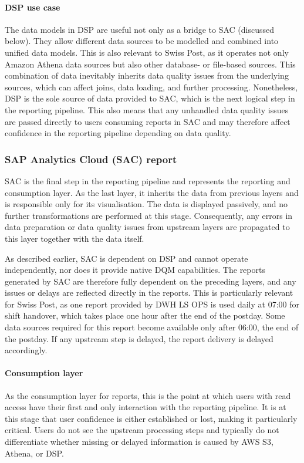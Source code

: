 \paragraph{DSP use case}
The data models in DSP are useful not only as a bridge to SAC (discussed below). They allow different data sources to be modelled and combined into unified data models. This is also relevant to Swiss Post, as it operates not only Amazon Athena data sources but also other database- or file-based sources. This combination of data inevitably inherits data quality issues from the underlying sources, which can affect joins, data loading, and further processing. Nonetheless, DSP is the sole source of data provided to SAC, which is the next logical step in the reporting pipeline. This also means that any unhandled data quality issues are passed directly to users consuming reports in SAC and may therefore affect confidence in the reporting pipeline depending on data quality.

\subsubsection*{SAP Analytics Cloud (SAC) report}
SAC is the final step in the reporting pipeline and represents the reporting and consumption layer. As the last layer, it inherits the data from previous layers and is responsible only for its visualisation. The data is displayed passively, and no further transformations are performed at this stage. Consequently, any errors in data preparation or data quality issues from upstream layers are propagated to this layer together with the data itself.

As described earlier, SAC is dependent on DSP and cannot operate independently, nor does it provide native DQM capabilities. The reports generated by SAC are therefore fully dependent on the preceding layers, and any issues or delays are reflected directly in the reports. This is particularly relevant for Swiss Post, as one report provided by DWH LS OPS is used daily at 07:00 for shift handover, which takes place one hour after the end of the \gls{postday}. Some data sources required for this report become available only after 06:00, the end of the postday. If any upstream step is delayed, the report delivery is delayed accordingly.

\paragraph{Consumption layer}
As the consumption layer for reports, this is the point at which users with read access have their first and only interaction with the reporting pipeline. It is at this stage that user confidence is either established or lost, making it particularly critical. Users do not see the upstream processing steps and typically do not differentiate whether missing or delayed information is caused by AWS S3, Athena, or DSP.